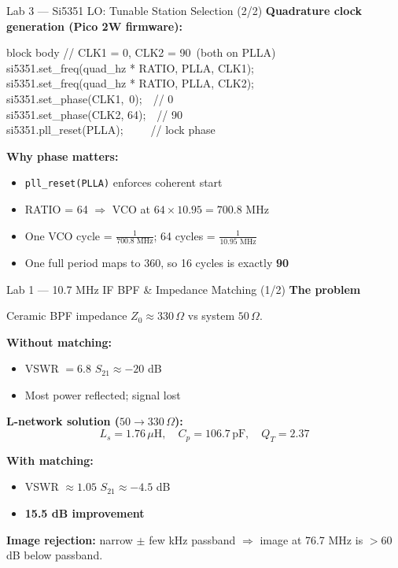 \documentclass[aspectratio=169]{beamer}
\begin{document}
\begin{frame}{Lab 3 --- Si5351 LO: Tunable Station Selection (2/2)}
\textbf{Quadrature clock generation (Pico 2W firmware):}
\begin{beamercolorbox}[rounded=true,shadow=false,wd=0.92\textwidth]{block body}
  \ttfamily\small
  // CLK1 = 0\textdegree, CLK2 = 90\textdegree\ (both on PLLA)\\
  si5351.set\_freq(quad\_hz * RATIO, PLLA, CLK1);\\
  si5351.set\_freq(quad\_hz * RATIO, PLLA, CLK2);\\[4pt]
  si5351.set\_phase(CLK1,\ 0);\ \ // 0\textdegree\\
  si5351.set\_phase(CLK2, 64);\ \ // 90\textdegree\\
  si5351.pll\_reset(PLLA);\ \ \ \ \ // lock phase
\end{beamercolorbox}

\vspace{0.4cm}
\textbf{Why phase matters:}
\begin{itemize}
  \item \texttt{pll\_reset(PLLA)} enforces coherent start
  \item RATIO = 64 $\Rightarrow$ VCO at $64\times10.95 = 700.8$ MHz
  \item One VCO cycle = $\frac{1}{700.8\text{ MHz}}$; 64 cycles = $\frac{1}{10.95\text{ MHz}}$
  \item One full period maps to 360\textdegree, so 16 cycles is exactly \textbf{90\textdegree}
\end{itemize}
\end{frame}

\begin{frame}{Lab 1 --- 10.7 MHz IF BPF \& Impedance Matching (1/2)}
\textbf{The problem}

Ceramic BPF impedance $Z_0 \approx 330\,\Omega$ vs system $50\,\Omega$.

\vspace{0.25cm}
\textbf{Without matching:}
\begin{itemize}
  \item VSWR $= 6.8$ \quad $S_{21} \approx -20$ dB
  \item Most power reflected; signal lost
\end{itemize}

\vspace{0.25cm}
\textbf{L-network solution ($50 \to 330\,\Omega$):}
\[
  L_s = 1.76\,\mu\text{H},\quad C_p = 106.7\,\text{pF},\quad Q_T = 2.37
\]

\textbf{With matching:}
\begin{itemize}
  \item VSWR $\approx 1.05$ \quad $S_{21} \approx -4.5$ dB
  \item \textbf{15.5 dB improvement}
\end{itemize}

\vspace{0.2cm}
\textbf{Image rejection:} narrow $\pm$ few kHz passband $\Rightarrow$
image at 76.7 MHz is $>60$ dB below passband.
\end{frame}
\end{document}
